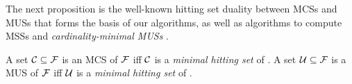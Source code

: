 The next proposition is the well-known hitting set duality \cite{DBLP:journals/jar/LiffitonS08,ai/Reiter87}  between MCSs and MUSs that forms the basis of our algorithms, as well as algorithms to compute MSSs \citet{DBLP:conf/sat/DaviesB13} and \emph{cardinality-minimal MUSs} \cite{ignatiev2015smallest}.

\begin{proposition}\label{prop:MCS-MUS-hittingset}
%     
    A set  $\mathcal{C} \subseteq \mathcal{F} $ is an MCS of $ \mathcal{F} $ iff  $\mathcal{C}$ is a \emph{minimal hitting set} of .
% 
    A set  $\mathcal{U} \subseteq \mathcal{F} $ is a MUS of $ \mathcal{F} $ iff  $\mathcal{U}$ is a \emph{minimal hitting set} of .
\end{proposition}
 


% 
% 
% 
% 
% 
